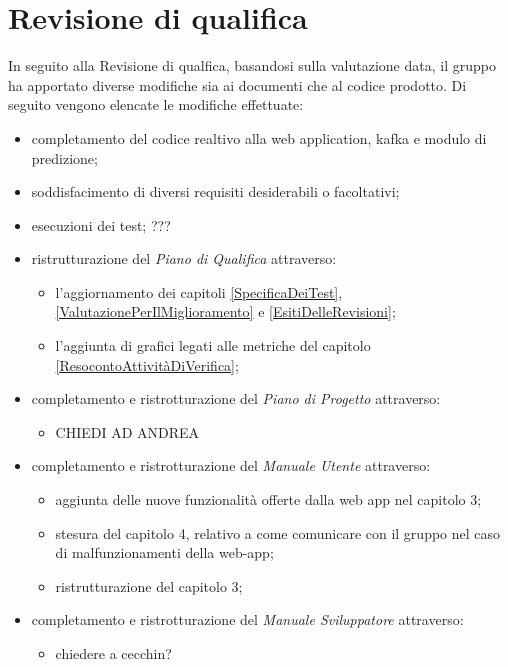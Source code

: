 \section{Revisione di qualifica}\label{EsitiDelleRevisioniRevisioneDiQualifica}
In seguito alla Revisione di qualfica, basandosi sulla valutazione data, il gruppo ha apportato diverse modifiche sia ai documenti che al codice prodotto. Di seguito vengono elencate le modifiche effettuate:
\begin{itemize}
		\item completamento del codice realtivo alla web application, kafka e modulo di predizione;
		\item soddisfacimento di diversi requisiti desiderabili o facoltativi;
		\item esecuzioni dei test; ???
		\item ristrutturazione del \textit{Piano di Qualifica} attraverso:
	\begin{itemize}
		\item l'aggiornamento dei capitoli \ref{SpecificaDeiTest}, \ref{ValutazionePerIlMiglioramento} e \ref{EsitiDelleRevisioni};
		\item l'aggiunta di grafici legati alle metriche del capitolo \ref{ResocontoAttivitàDiVerifica};
	\end{itemize}
	\item completamento e ristrotturazione del \textit{Piano di Progetto} attraverso:
	\begin{itemize}
		\item CHIEDI AD ANDREA
	\end{itemize}
	\item completamento e ristrotturazione del \textit{Manuale Utente} attraverso: 
	\begin{itemize}
		\item aggiunta delle nuove funzionalità offerte dalla web app nel capitolo 3;
		\item stesura del capitolo 4, relativo a come comunicare con il gruppo nel caso di malfunzionamenti della web-app;
		\item ristrutturazione del capitolo 3;
	\end{itemize}
\item completamento e ristrotturazione del \textit{Manuale Sviluppatore} attraverso: 
\begin{itemize}
	\item chiedere a cecchin?
\end{itemize}

\end{itemize}